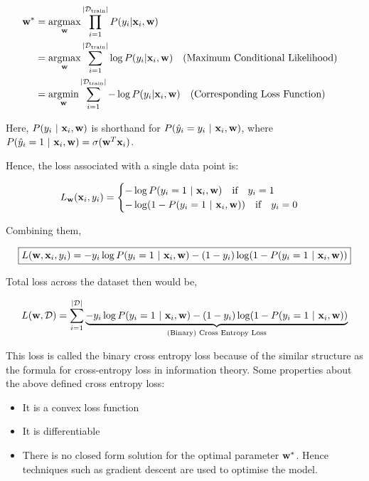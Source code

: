 \begin{align*}
  \tc{w}^* & = \underset{\tc{w}}{\text{argmax}} \prod_{i=1}^{| \D_{\text{train}}|} P(y_i | \tc{x}_i, \tc{w})                                           \\
           & = \underset{\tc{w}}{\text{argmax}} \sum_{i=1}^{| \D_{\text{train}}|} \log P(y_i | \tc{x}_i, \tc{w}) \qq{(Maximum Conditional Likelihood)} \\
           & = \underset{\tc{w}}{\text{argmin}}  \sum_{i=1}^{| \D_{\text{train}}|} -\log P(y_i | \tc{x}_i, \tc{w}) \qq{(Corresponding Loss Function)}
\end{align*}

Here, $ P(y_i \ | \  \textbf{x}_i, \textbf{w}) $ is shorthand for $ P(\hat y_i = y_i\ | \  \textbf{x}_i, \textbf{w}) $, where $P(\hat y_i = 1 \ | \  \textbf{x}_i, \textbf{w}) = \sigma(\textbf{w}^T \textbf{x}_i)$.

Hence, the loss associated with a single data point is:

\begin{align*}
  L_{\tc{w}} (\tc{x}_i, y_i) = \begin{cases}
                                 -\log P(y_i = 1 \pipe \tc{x}_i, \tc{w}) \qq{if} y_i = 1 \\
                                 -\log (1 - P(y_i = 1 \pipe \tc{x}_i, \tc{w})) \qq{if} y_i = 0
                               \end{cases}
\end{align*}

Combining them,

\begin{equation*}
  \boxed{L (\textbf{w}, \textbf{x}_i, y_i) = -y_i \log P(y_i = 1 \ | \  \textbf{x}_i, \textbf{w}) - (1 - y_i) \log (1 - P(y_i = 1 \ | \  \textbf{x}_i, \textbf{w}))}
\end{equation*}

Total loss across the dataset then would be,

\begin{equation*}
  L  (\textbf{w},  \mathcal{D}) = \sum_{i = 1}^{| \mathcal{D}|} \underbrace{-y_i \log P(y_i = 1 \ | \  \textbf{x}_i, \textbf{w}) - (1 - y_i) \log (1 - P(y_i = 1 \ | \  \textbf{x}_i, \textbf{w})) }_{\text{(Binary) Cross Entropy Loss}}
\end{equation*}

This loss is called the binary cross entropy loss because of the similar structure as the formula for cross-entropy loss in information theory. Some properties about the above defined cross entropy loss:

\begin{itemize}
  \item It is a convex loss function
  \item It is differentiable
  \item There is no closed form solution for the optimal parameter $\textbf{w}^*$. Hence techniques such as gradient descent are used to optimise the model.
\end{itemize}

